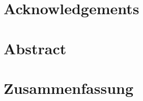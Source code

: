 \chapter{Acknowledgements}


\chapter{Abstract}



\vspace{3cm}

\begingroup
\renewcommand{\cleardoublepage}{}
\renewcommand{\clearpage}{}
\chapter{Zusammenfassung}\label{chap:abstract_german}

\endgroup